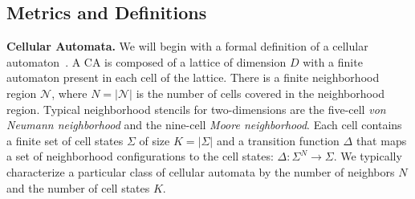 \documentclass[a4paper,11pt]{article}
\begin{document}

\subsection{Metrics and Definitions}
\label{subsec:metrics}
\textbf{Cellular Automata.} We will begin with a formal definition of a cellular automaton~\cite{la90}. A CA is composed of a lattice of dimension $D$ with a finite automaton present in each cell of the lattice. There is a finite neighborhood region $\mathcal{N}$, where $N = |\mathcal{N}|$ is the number of cells covered in the neighborhood region. Typical neighborhood stencils for two-dimensions are the five-cell \textit{von Neumann neighborhood} and the nine-cell \textit{Moore neighborhood}. %
Each cell contains a finite set of cell states $\Sigma$ of size $K = |\Sigma|$ and a transition function $\Delta$ that maps a set of neighborhood configurations to the cell states: $\Delta: \Sigma^N \to \Sigma$. We typically characterize a particular class of cellular automata by the number of neighbors $N$ and the number of cell states $K$.
\end{document}
